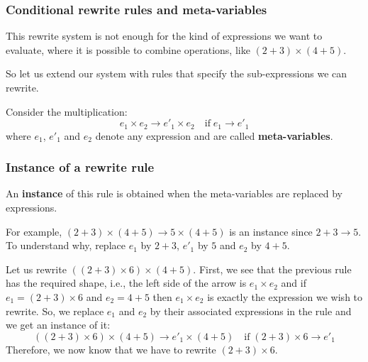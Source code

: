 \documentclass[compress,dvipdfmx]{beamer}
\begin{document}
%
\begin{frame}
  \frametitle{Conditional rewrite rules and meta-variables}

  This rewrite system is not enough for the kind of expressions we
  want to evaluate, where it is possible to combine operations, like
  \((2+3) \times (4+5)\).

  \bigskip

  So let us extend our system with rules that specify the
  sub-expressions we can rewrite.

  \bigskip

  Consider the multiplication:
  \begin{equation*}
    e_1 \times e_2 \rightarrow e'_1 \times e_2 \quad \text{if} \; e_1
    \rightarrow e'_1
  \end{equation*}
  where \(e_1\), \(e'_1\) and \(e_2\) denote any expression and are
  called \textbf{meta\hyp{}variables}.

\end{frame}


%
\begin{frame}
  \frametitle{Instance of a rewrite rule}

  An \textbf{instance} of this rule is obtained when the
  meta-variables are replaced by expressions.

  \bigskip

  For example, \( (2+3) \times (4+5) \rightarrow 5 \times (4+5) \) is
  an instance since \(2 + 3 \rightarrow 5\). To understand why,
  replace \(e_1\) by \(2+3\), \(e'_1\) by \(5\) and \(e_2\) by
  \(4+5\).

  \bigskip

  Let us rewrite \(((2 + 3) \times 6) \times (4+5)\). First, we see
  that the previous rule has the required shape, i.e., the left side
  of the arrow is \(e_1 \times e_2\) and if \(e_1 = (2+3) \times 6\)
  and \(e_2 = 4+5\) then \(e_1 \times e_2\) is exactly the expression
  we wish to rewrite. So, we replace \(e_1\) and \(e_2\) by their
  associated expressions in the rule and we get an instance of it:
  \begin{equation*}
    ((2 + 3) \times 6) \times (4+5) \rightarrow e'_1 \times (4+5)
    \quad \text{if} \; (2+3) \times 6 \rightarrow e'_1
  \end{equation*}
  Therefore, we now know that we have to rewrite \((2 + 3) \times 6\).

\end{frame}
\end{document}
